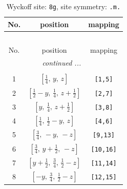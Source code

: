 \documentclass[fleqn,8pt]{jsarticle}
\begin{document}
\begin{longtable}{ccc}
\caption{Wyckoff site: {\tt 8g}, site symmetry: {\tt .m.}}
 \\
 \hline \hline
No. & position & mapping \\ \hline \endfirsthead

\multicolumn{2}{l}{\tablename\ \thetable{}} \\
 \hline \hline
No. & position & mapping \\ \hline \endhead

 \hline \hline
\multicolumn{2}{r}{\footnotesize\it continued ...} \\ \endfoot

 \hline \hline
\multicolumn{2}{r}{} \\ \endlastfoot

1 & $\left[ \frac{1}{4},\, y,\, z \right]$ & {\tt [1,5]} \\ \hline
2 & $\left[ \frac{1}{2} - y,\, \frac{1}{4},\, z + \frac{1}{2} \right]$ & {\tt [2,7]} \\ \hline
3 & $\left[ y,\, \frac{1}{4},\, z + \frac{1}{2} \right]$ & {\tt [3,8]} \\ \hline
4 & $\left[ \frac{1}{4},\, \frac{1}{2} - y,\, z \right]$ & {\tt [4,6]} \\ \hline
5 & $\left[ \frac{3}{4},\, - y,\, - z \right]$ & {\tt [9,13]} \\ \hline
6 & $\left[ \frac{3}{4},\, y + \frac{1}{2},\, - z \right]$ & {\tt [10,16]} \\ \hline
7 & $\left[ y + \frac{1}{2},\, \frac{3}{4},\, \frac{1}{2} - z \right]$ & {\tt [11,14]} \\ \hline
8 & $\left[ - y,\, \frac{3}{4},\, \frac{1}{2} - z \right]$ & {\tt [12,15]} \\
\end{longtable}
\renewcommand{\arraystretch}{1.2}
\end{document}
